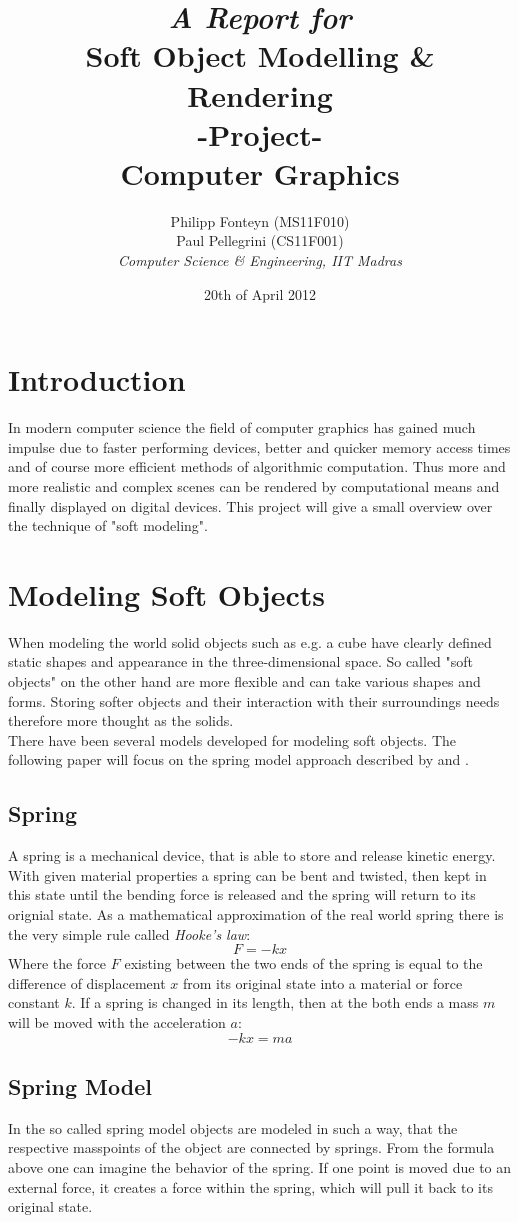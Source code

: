 \documentclass[11pt]{article}
\title{
	\emph{A Report for}\\
	\huge{\textbf{Soft Object Modelling \& Rendering} }\\
	-Project-\\
	Computer Graphics\\[2em]	
}
\author{
	Philipp Fonteyn (MS11F010)\\
	Paul Pellegrini (CS11F001)\\[2em]
	\emph{Computer Science \& Engineering, IIT Madras}
}
\date{20th of April 2012}
\begin{document}
\maketitle
\newpage
\tableofcontents
\newpage

%
%
%
\section{Introduction}
In modern computer science the field of computer graphics has gained much impulse due to faster performing devices, better and quicker memory access times and of course more efficient methods of algorithmic computation. Thus more and more realistic and complex scenes can be rendered by computational means and finally displayed on digital devices. This project will give a small overview over the technique of "soft modeling".
%
%
%
\section{Modeling Soft Objects}
When modeling the world solid objects such as e.g. a cube have clearly defined static shapes and appearance in the three-dimensional space. So called "soft objects" on the other hand are more flexible and can take various shapes and forms. Storing softer objects and their interaction with their surroundings needs therefore more thought as the solids.\\[1em]
%
There have been several models developed for modeling soft objects. The following paper will focus on the spring model approach described by \cite{LSCS} and \cite{hair}\cite{gama}.\\[1em]
%
\subsection{Spring}
A spring is a mechanical device, that is able to store and release kinetic energy. With given material properties a spring can be bent and twisted, then kept in this state until the bending force is released and the spring will return to its orignial state. As a mathematical approximation of the real world spring there is the very simple rule called \textit{Hooke's law}:
$$F=-kx$$
Where the force $F$ existing between the two ends of the spring is equal to the difference of displacement $x$ from its original state into a material or force constant $k$. If a spring is changed in its length, then at the both ends a mass $m$ will be moved with the acceleration $a$:
$$-kx = ma$$

\subsection{Spring Model}
In the so called spring model objects are modeled in such a way, that the respective masspoints of the object are connected by springs. From the formula above one can imagine the behavior of the spring. If one point is moved due to an external force, it creates a force within the spring, which will pull it back to its original state.
\end{document}
